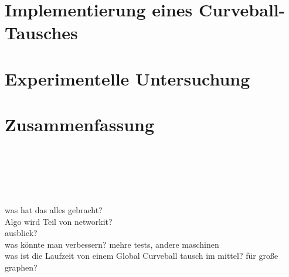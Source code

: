 \documentclass[a4paper, 11pt]{scrreprt}
\theoremstyle{plain} %
\theoremstyle{definition} %
\newcommand{\gc}{Global Curveball}
\newcommand{\ct}{Curveball-Tausch}
\newcommand{\red}[1]{\textcolor{red}{\textbf{#1}}}
\begin{document}


\chapter{Implementierung eines \ct{es} }





\chapter{Experimentelle Untersuchung}












\chapter{Zusammenfassung}



~\\
\\
\\
\\
\\
was hat das alles gebracht? \\
Algo wird Teil von networkit?\\
ausblick?\\
was könnte man verbessern? mehre tests, andere maschinen
\\
was ist die Laufzeit von einem \gc{} tausch im mittel? für große graphen?
\end{document}
